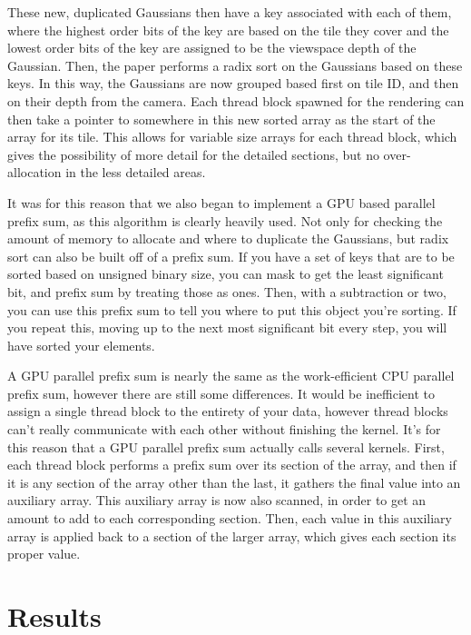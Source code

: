 \documentclass[12pt, a4paper, twocolumn]{article}
\begin{document}
These new, duplicated Gaussians then have a key associated with each of them, where the highest order bits of the key are based on the tile they cover and the lowest order bits of the key are assigned to be the viewspace depth of the Gaussian. Then, the paper performs a radix sort on the Gaussians based on these keys. In this way, the Gaussians are now grouped based first on tile ID, and then on their depth from the camera. Each thread block spawned for the rendering can then take a pointer to somewhere in this new sorted array as the start of the array for its tile. This allows for variable size arrays for each thread block, which gives the possibility of more detail for the detailed sections, but no over-allocation in the less detailed areas.

It was for this reason that we also began to implement a GPU based parallel prefix sum, as this algorithm is clearly heavily used. Not only for checking the amount of memory to allocate and where to duplicate the Gaussians, but radix sort can also be built off of a prefix sum. If you have a set of keys that are to be sorted based on unsigned binary size, you can mask to get the least significant bit, and prefix sum by treating those as ones. Then, with a subtraction or two,
you can use this prefix sum to tell you where to put this object you're sorting. If you repeat this, moving up to the next most significant bit every step, you will have sorted your elements. 

A GPU parallel prefix sum is nearly the same as the work-efficient CPU parallel prefix sum, however there are still some differences. It would be inefficient to assign a single thread block to the entirety of your data, however thread blocks can't really communicate with each other without finishing the kernel. It's for this reason that a GPU parallel prefix sum actually calls several kernels. First, each thread block performs a prefix sum over its section of the array, and then if it is any section of the array
other than the last, it gathers the final value into an auxiliary array. This auxiliary array is now also
scanned, in order to get an amount to add to each corresponding section. Then, each value in this auxiliary array is applied back to a section of the larger array, which gives each section its proper value.

\section{Results}
\end{document}
